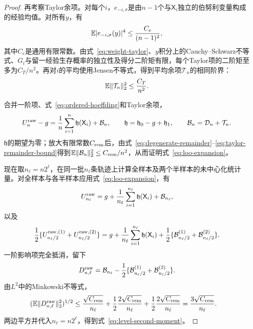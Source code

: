 \begin{proof}
再考察Taylor余项。对每个$i$，$e_{-i,\sigma}$是由$n-1$个与$\mathsf X_i$独立的伯努利变量构成的经验均值。对所有$y$，有
\begin{equation}\label{eq:bernoulli-fourth-moment}
 \mathbb E\lvert e_{-i,\sigma}(y)\rvert^4\le\frac{C_e}{(n-1)^2},
\end{equation}
其中$C_e$是通用有限常数。由式~\eqref{eq:weight-taylor}、$y$积分上的Cauchy--Schwarz不等式、$G_i$与留一经验生存概率的独立性及得分二阶矩有限，每个Taylor项的二阶矩至多为$C_T/n^2$。再对$i$的平均使用Jensen不等式，得到平均余项$\mathcal T_n$的相同阶界：
\begin{equation}\label{eq:taylor-remainder-bound}
 \mathbb E\lVert\mathcal T_n\rVert_2^2\le\frac{C_T}{n^2}.
\end{equation}

合并一阶项、式~\eqref{eq:ordered-hoeffding}和Taylor余项，
\[
 U_n^{\rm raw}-g
 =\frac1n\sum_{i=1}^{n}\mathfrak h(\mathsf X_i)+\mathcal B_n,
 \qquad
 \mathfrak h=\mathfrak h_0-g+\mathfrak h_1,
 \qquad
 \mathcal B_n=\mathcal D_n+\mathcal T_n.
\]
$\mathfrak h$的期望为零；放大有限常数$C_{\rm rem}$后，由式~\eqref{eq:degenerate-remainder}--\eqref{eq:taylor-remainder-bound}得到$\mathbb E\lVert\mathcal B_n\rVert_2^2\le C_{\rm rem}/n^2$，从而证明式~\eqref{eq:loo-expansion}。

现在取$n_\ell=n2^\ell$，在同一批$n_\ell$条轨迹上计算全样本及两个半样本的未中心化统计量。对全样本与各半样本应用式~\eqref{eq:loo-expansion}，有
\[
 U_{n_\ell}^{\rm raw}
 =g+\frac1{n_\ell}\sum_{i=1}^{n_\ell}\mathfrak h(\mathsf X_i)+\mathcal B_{n_\ell},
\]
以及
\[
 \frac12\{U_{n_\ell/2}^{\rm raw,(1)}+U_{n_\ell/2}^{\rm raw,(2)}\}
 =g+\frac1{n_\ell}\sum_{i=1}^{n_\ell}\mathfrak h(\mathsf X_i)
 +\frac12\{\mathcal B_{n_\ell/2}^{(1)}+\mathcal B_{n_\ell/2}^{(2)}\}.
\]
一阶影响项完全抵消，留下
\[
 D_{n,\ell}^{\rm raw}
 =\mathcal B_{n_\ell}-\frac12\{\mathcal B_{n_\ell/2}^{(1)}+\mathcal B_{n_\ell/2}^{(2)}\}.
\]
由$L^2$中的Minkowski不等式，
\begin{align*}
 (\mathbb E\lVert D_{n,\ell}^{\rm raw}\rVert_2^2)^{1/2}
 &\le\frac{\sqrt{C_{\rm rem}}}{n_\ell}
 +\frac12\frac{2\sqrt{C_{\rm rem}}}{n_\ell}
 +\frac12\frac{2\sqrt{C_{\rm rem}}}{n_\ell}
 =\frac{3\sqrt{C_{\rm rem}}}{n_\ell}.
\end{align*}
两边平方并代入$n_\ell=n2^\ell$，得到式~\eqref{eq:level-second-moment}。


\end{proof}
